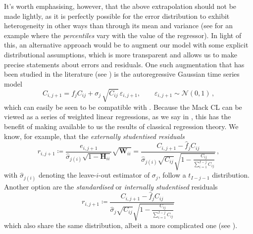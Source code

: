 \documentclass[a4paper]{book}
\begin{document}
It's worth emphasising, however, that the above extrapolation should not be made lightly, as it is perfectly possible for the error distribution to exhibit heterogeneity in other ways than through its mean and variance (see \cite[114]{efron:intro} for an example where the \emph{percentiles} vary with the value of the regressor). In light of this, an alternative approach would be to augment our model with some explicit distributional assumptions, which is more transparent and allows us to make precise statements about errors and residuals. One such augmentation that has been studied in the literature (see \cite[49]{wuthrich:stochastic-reserving}) is the autoregressive Gaussian time series model
\begin{equation} \label{eq:time-series-model}
    C_{i, j + 1} = f_j C_{ij} + \sigma_j \, \sqrt{C_{ij}} \, \varepsilon_{i, j + 1}, \qquad \varepsilon_{i, j + 1} \sim \mathcal{N}(0, 1) \,,
\end{equation}
which can easily be seen to be compatible with . Because the Mack CL can be viewed as a series of weighted linear regressions, as we say in , this has the benefit of making available to us the results of classical regression theory. We know, for example, that the \emph{externally studentised residuals}
\begin{equation}
  r_{i, j + 1} 
  \coloneqq \frac{e_{i, j + 1}}{\widehat{\sigma}_{j (i)} \sqrt{1 - \mathbf{H}_{ii}}} \sqrt{\mathbf{W}_{ii}} 
  = \frac{C_{i, j + 1} - \widehat{f}_j C_{ij}}{\widehat{\sigma}_{j (i)} \sqrt{C_{ij}} \sqrt{1 - \frac{C_{ij}}{\sum_{i = 1}^{I - j} C_{ij}}}} \,,
\end{equation}
with $\widehat{\sigma}_{j (i)}$ denoting the leave-$i$-out estimator of $\sigma_j$, follow a $t_{I - j - 1}$ distribution. Another option are the \emph{standardised} or \emph{internally studentised} residuals
\begin{equation}
  r_{i, j + 1} \coloneqq \frac{C_{i, j + 1} - \widehat{f}_j C_{ij}}{\widehat{\sigma}_j \sqrt{C_{ij}} \sqrt{1 - \frac{C_{ij}}{\sum_{i = 1}^{I - j} C_{ij}}}} \,
\end{equation}
which also share the same distribution, albeit a more complicated one (see \cite[267 \psqq]{seber}). 
\end{document}
